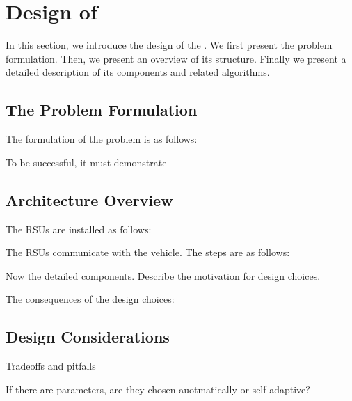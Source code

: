 \section{Design of }
\label{design}

In this section, we introduce the design of the . We first present the problem formulation. Then, we present an overview of its structure. Finally we present a detailed description of its components and related algorithms.


\subsection{The Problem Formulation}
\label{problemformulation}

The formulation of the problem is as follows: 

To be successful, it must demonstrate



\subsection{Architecture Overview}
\label{architecture}

The RSUs are installed as follows: 


The RSUs communicate with the vehicle. The steps are as follows:


Now the detailed components. Describe the motivation for design choices.  
 

The consequences of the design choices:


\subsection{Design Considerations}

Tradeoffs and pitfalls

If there are parameters, are they chosen auotmatically or self-adaptive?
 


